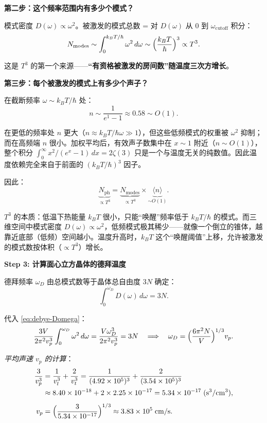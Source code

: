 \begin{derivationbox}[标准解题过程]
\textbf{第二步：这个频率范围内有多少个模式？}

模式密度 $D(\omega)\propto\omega^2$。被激发的模式总数 = 对 $D(\omega)$ 从 $0$ 到 $\omega_{\text{cutoff}}$ 积分：
\begin{equation}
N_{\text{modes}}\sim\int_0^{k_BT/\hbar}\omega^2\,d\omega\sim\Bigl(\frac{k_BT}{\hbar}\Bigr)^3\propto T^3.
\end{equation}

这是 $T^3$ 的第一个来源——\textbf{``有资格被激发的房间数''随温度三次方增长}。

\textbf{第三步：每个被激发的模式上有多少个声子？}

在截断频率 $\omega\sim k_BT/\hbar$ 处：
\begin{equation}
n\sim\frac{1}{e^{1}-1}\approx0.58\sim O(1).
\end{equation}

在更低的频率处 $n$ 更大（$n\approx k_BT/\hbar\omega\gg1$），但这些低频模式的权重被 $\omega^2$ 抑制；而在高频端 $n$ 很小。加权平均后，有效声子数集中在 $x\sim1$ 附近（$n\sim O(1)$），整个积分 $\int_0^{\infty}x^2/(e^x-1)\,dx=2\zeta(3)$ 只是一个与温度无关的纯数值。因此温度依赖完全来自于前面的 $(k_BT/\hbar)^3$ 因子。

因此：
\begin{equation}
\underbrace{N_{\text{ph}}}_{\propto T^3}=\underbrace{N_{\text{modes}}}_{\propto T^3}\times\underbrace{\langle n\rangle}_{\sim O(1)}.
\end{equation}

$\boxed{T^3}$ 的本质：低温下热能量 $k_BT$ 很小，只能``唤醒''频率低于 $k_BT/\hbar$ 的模式。而三维空间中模式密度 $D(\omega)\propto\omega^2$，低频模式极其稀少——就像一个倒立的锥体，越靠近底部（低频）空间越小。温度升高时，$k_BT$ 这个``唤醒阈值''上移，允许被激发的模式数按体积（$\propto T^3$）增长。

\textbf{Step 3: 计算面心立方晶体的德拜温度}

德拜频率 $\omega_D$ 由总模式数等于晶体总自由度 $3N$ 确定：
\begin{equation}
\int_0^{\omega_D}D(\omega)\,d\omega = 3N.
\end{equation}

代入 \eqref{eq:debye-Domega}：
\begin{equation}
\frac{3V}{2\pi^2v_p^3}\int_0^{\omega_D}\omega^2\,d\omega = \frac{V\omega_D^3}{2\pi^2v_p^3}=3N
\quad\Longrightarrow\quad
\omega_D=\Bigl(\frac{6\pi^2N}{V}\Bigr)^{1/3}v_p.
\end{equation}

\textit{平均声速 $v_p$ 的计算}：
\begin{align}
\frac{3}{v_p^3}&=\frac{1}{v_l^3}+\frac{2}{v_t^3}
=\frac{1}{(4.92\times10^5)^3}+\frac{2}{(3.54\times10^5)^3}\\
&\approx 8.40\times10^{-18}+2\times2.25\times10^{-17}
=5.34\times10^{-17}\;(\mathrm{s^3/cm^3}),\\[4pt]
v_p&=\Bigl(\frac{3}{5.34\times10^{-17}}\Bigr)^{1/3}\approx3.83\times10^5\;\mathrm{cm/s}.
\end{align}


\end{derivationbox}
